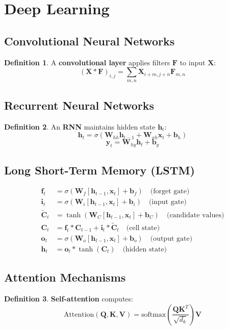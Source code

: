 \documentclass[11pt]{article}
\theoremstyle{definition}
\newtheorem{definition}{Definition}[section]
\begin{document}
\section{Deep Learning}

\subsection{Convolutional Neural Networks}
\begin{definition}
A \textbf{convolutional layer} applies filters $\mathbf{F}$ to input $\mathbf{X}$:
$$(\mathbf{X} * \mathbf{F})_{i,j} = \sum_{m,n} \mathbf{X}_{i+m,j+n} \mathbf{F}_{m,n}$$
\end{definition}

\subsection{Recurrent Neural Networks}
\begin{definition}
An \textbf{RNN} maintains hidden state $\mathbf{h}_t$:
$$\mathbf{h}_t = \sigma(\mathbf{W}_{hh}\mathbf{h}_{t-1} + \mathbf{W}_{xh}\mathbf{x}_t + \mathbf{b}_h)$$
$$\mathbf{y}_t = \mathbf{W}_{hy}\mathbf{h}_t + \mathbf{b}_y$$
\end{definition}

\subsection{Long Short-Term Memory (LSTM)}
\begin{align}
\mathbf{f}_t &= \sigma(\mathbf{W}_f[\mathbf{h}_{t-1}, \mathbf{x}_t] + \mathbf{b}_f) \quad \text{(forget gate)} \\
\mathbf{i}_t &= \sigma(\mathbf{W}_i[\mathbf{h}_{t-1}, \mathbf{x}_t] + \mathbf{b}_i) \quad \text{(input gate)} \\
\tilde{\mathbf{C}}_t &= \tanh(\mathbf{W}_C[\mathbf{h}_{t-1}, \mathbf{x}_t] + \mathbf{b}_C) \quad \text{(candidate values)} \\
\mathbf{C}_t &= \mathbf{f}_t * \mathbf{C}_{t-1} + \mathbf{i}_t * \tilde{\mathbf{C}}_t \quad \text{(cell state)} \\
\mathbf{o}_t &= \sigma(\mathbf{W}_o[\mathbf{h}_{t-1}, \mathbf{x}_t] + \mathbf{b}_o) \quad \text{(output gate)} \\
\mathbf{h}_t &= \mathbf{o}_t * \tanh(\mathbf{C}_t) \quad \text{(hidden state)}
\end{align}

\subsection{Attention Mechanisms}
\begin{definition}
\textbf{Self-attention} computes:
$$\text{Attention}(\mathbf{Q}, \mathbf{K}, \mathbf{V}) = \text{softmax}\left(\frac{\mathbf{Q}\mathbf{K}^T}{\sqrt{d_k}}\right)\mathbf{V}$$
\end{definition}
\end{document}
